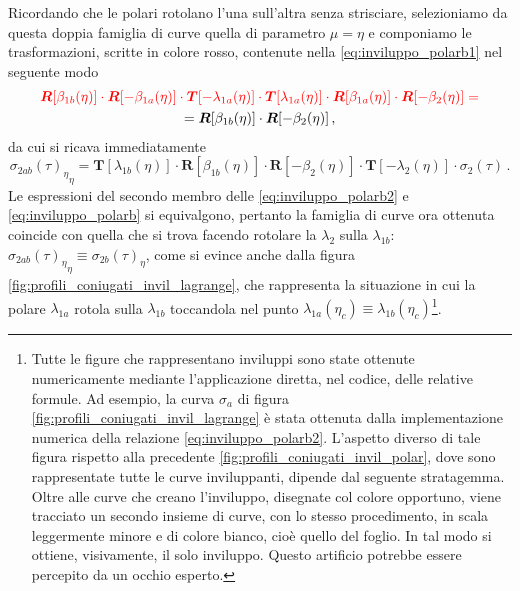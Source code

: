 \noindent Ricordando che le polari rotolano l'una sull'altra senza strisciare,
selezioniamo da questa doppia famiglia di curve quella di parametro
$\mu=\eta$ e componiamo le trasformazioni, scritte in colore rosso,
contenute nella \ref{eq:inviluppo_polarb1} nel seguente modo
\begin{multline}
\color{red} {\bm R}[\beta_{1b}(\eta)]\cdot{\bm R}[-\beta_{1a}(\eta)]\cdot
 {\bm T} [-\lambda_{1a}(\eta)]\cdot 
 {\bm T}[\lambda_{1a}(\eta)]\cdot {\bm R}[\beta_{1a}(\eta)]\cdot{\bm R}[-\beta_2(\eta)]=\\
={\bm R}[\beta_{1b}(\eta)]\cdot{\bm R}[-\beta_2(\eta)]\,, 
\label{eq:id}
\end{multline}
\noindent da cui si ricava immediatamente
\begin{equation}
{{\sigma_{2ab}(\tau)}_\eta}_\eta = 
 {\bm T}[\lambda_{1b}(\eta)]\cdot {\bm R}[\beta_{1b}(\eta)]\cdot
{\bm R}[-\beta_2(\eta)] \cdot
 {\bm T} [-\lambda_2(\eta)]\cdot \sigma_2(\tau)\,.
\label{eq:inviluppo_polarb2}
\end{equation}
\noindent Le espressioni del secondo membro delle \ref{eq:inviluppo_polarb2}
e \ref{eq:inviluppo_polarb} si equivalgono, pertanto
la famiglia di curve ora ottenuta coincide con quella
che si trova facendo rotolare la $\lambda_2$ sulla $\lambda_{1b}$:
${{\sigma_{2ab}(\tau)}_\eta}_\eta\equiv {\sigma_{2b}(\tau)}_\eta$,
come si evince anche dalla figura
\ref{fig:profili_coniugati_invil_lagrange}, che
rappresenta la situazione in cui la polare $\lambda_{1a}$ rotola sulla
$\lambda_{1b}$ toccandola nel punto
$\lambda_{1a}(\eta_c)\equiv \lambda_{1b}(\eta_c)$\footnote
{
Tutte le figure che rappresentano inviluppi sono state ottenute numericamente
mediante l'applicazione diretta, nel codice, delle relative formule.  Ad esempio,
la curva $\sigma_a$ di figura \ref{fig:profili_coniugati_invil_lagrange} \`e stata
ottenuta dalla implementazione numerica della relazione
\ref{eq:inviluppo_polarb2}. L'aspetto diverso di tale figura
rispetto alla precedente
\ref{fig:profili_coniugati_invil_polar}, dove sono rappresentate tutte le curve
inviluppanti, dipende dal seguente stratagemma.
Oltre alle curve che creano l'inviluppo, disegnate col colore opportuno,
viene tracciato un secondo insieme di curve, con lo stesso procedimento, in
scala leggermente minore e di
colore bianco, cio\`e quello del foglio. In tal modo si ottiene, visivamente,
il solo inviluppo. Questo artificio potrebbe essere percepito da un occhio esperto.}.
